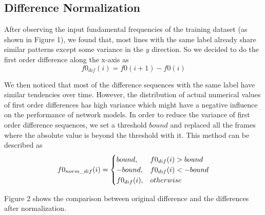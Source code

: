 \documentclass[a4paper, 11pt]{article} %
\begin{document}
\subsection{Difference Normalization}
After observing the input fundamental frequencies of the training dataset (as shown in Figure 1), we found that, most lines with the same label already share similar patterns except some variance in the $y$ direction. So we decided to do the first order difference along the x-axis as
$$ f0_{dif}(i) = f0(i+1) - f0(i) $$
\par
We then noticed that most of the difference sequences with the same label have similar tendencies over time. However, the distribution of actual numerical values of first order differences has high variance which might have a negative influence on the performance of network models.  In order to reduce the variance of first order difference sequences, we set a threshold $bound$ and replaced all the frames where the absolute value is beyond the threshold with it. This method can be described as
\begin{equation}
    f0_{norm\_ dif}(i)=
   \begin{cases}
bound, & f0_{dif}(i) > bound \cr
-bound, & f0_{dif}(i) < -bound \cr
f0_{dif}(i), & otherwise
   \end{cases}
\end{equation}
\par
Figure 2 shows the comparison between original difference and the differences after normalization.
\vspace{1cm}
\end{document}
